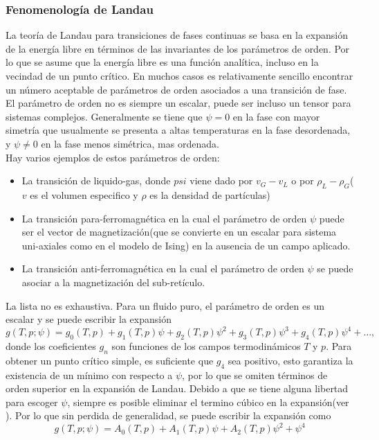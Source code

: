 \documentclass[a4paper]{article}
\begin{document}
\subsubsection{Fenomenología de Landau}
La teoría de Landau para transiciones de fases continuas se basa en la expansión de la energía libre en términos de las invariantes de los parámetros de orden. Por lo que se asume que la energía libre es una función analítica, incluso en la vecindad de un punto crítico. En muchos casos es relativamente sencillo  encontrar un número aceptable  de parámetros de orden asociados a una transición de fase. El parámetro de orden no es siempre un escalar, puede ser incluso un tensor para sistemas complejos. Generalmente se tiene que $\psi=0$ en la fase con mayor simetría que usualmente se presenta a altas temperaturas en la fase desordenada, y $\psi\neq0$ en la fase menos simétrica, mas ordenada.\\
Hay varios ejemplos de estos parámetros de orden:
\begin{itemize}
\item La transición de liquido-gas, donde $psi$ viene dado por $v_G-v_L$ o por $\rho_L-\rho_G$($v$ es el volumen especifico y $\rho$ es la densidad de partículas)
\item La transición para-ferromagnética en la cual el parámetro de orden $\psi$ puede ser el vector de magnetización(que se convierte en un escalar para sistema uni-axiales como en el modelo de Ising) en la ausencia de un campo aplicado.
\item La transición anti-ferromagnética  en la cual el parámetro de orden $\psi$ se puede asociar a la magnetización del sub-retículo.
\end{itemize}
La lista no es exhaustiva. Para un fluido puro, el parámetro de orden es un escalar y se puede escribir la expansión
\begin{equation}
g(T,p;\psi)=g_0(T,p)+g_1(T,p)\psi+g_2(T,p)\psi^2+g_3(T,p)\psi^3+g_4(T,p)\psi^4+\hdots,
\end{equation}
donde los coeficientes $g_n$ son funciones de los campos termodinámicos $T$ y $p$. Para obtener un punto crítico simple, es suficiente que $g_4$ sea positivo, esto garantiza la existencia de un mínimo con respecto a $\psi$, por lo que se omiten términos de orden superior en la expansión de Landau. Debido a que se tiene alguna libertad para escoger $\psi$, siempre es posible eliminar el termino cúbico en la expansión(ver \cite{Salinas}). Por lo que sin perdida de generalidad, se puede escribir la expansión como
\begin{equation}
g(T,p;\psi)=A_0(T,p)+A_1(T,p)\psi+A_2(T,p)\psi^2+\psi^4
\end{equation}
\end{document}
